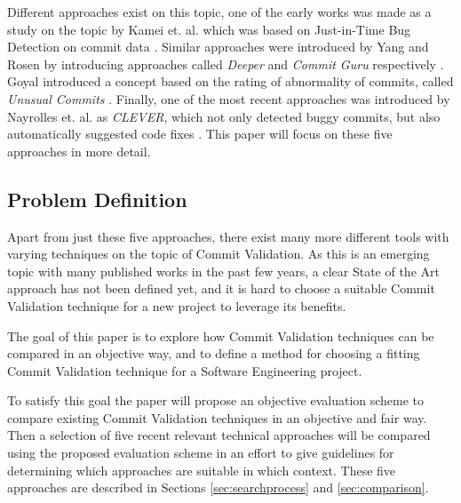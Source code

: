 Different approaches exist on this topic,
one of the early works was made as a study on the topic by Kamei et. al. which was based on Just-in-Time Bug Detection on commit data \cite{Kamei2013}. Similar approaches were introduced by Yang and Rosen by introducing approaches called \textit{Deeper} and \textit{Commit Guru} respectively \cite{Yang2015,Rosen2015}. Goyal introduced a concept based on the rating of abnormality of commits, called \textit{Unusual Commits} \cite{Goyal2017}. Finally, one of the most recent approaches was introduced by Nayrolles et. al. as \textit{CLEVER}, which not only detected buggy commits, but also automatically suggested code fixes \cite{Nayrolles2018}. This paper will focus on these five approaches in more detail.

\subsection{Problem Definition}

Apart from just these five approaches, there exist many more different tools with varying techniques on the topic of Commit Validation.
As this is an emerging topic with many published works in the past few years, a clear State of the Art approach has not been defined yet, and it is hard to choose a suitable Commit Validation technique for a new project to leverage its benefits. 

The goal of this paper is to explore how Commit Validation techniques can be compared in an objective way, and to define a method for choosing a fitting Commit Validation technique for a Software Engineering project.

To satisfy this goal the paper will propose an objective evaluation scheme to compare existing Commit Validation techniques in an objective and fair way. Then a selection of five recent relevant technical approaches will be compared using the proposed evaluation scheme in an effort to give guidelines for determining which approaches are suitable in which context. These five approaches are described in Sections \ref{sec:searchprocess} and \ref{sec:comparison}.

